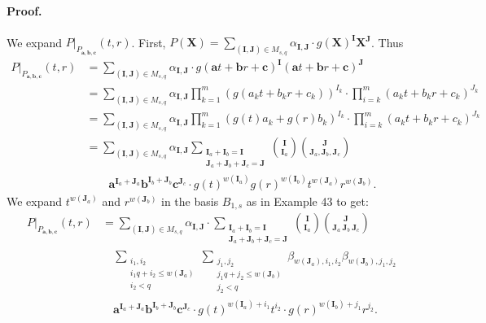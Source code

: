 \documentclass[10pt,a4paper]{article}
\begin{document}
\paragraph{Proof.} We expand $P|_{P_{\boldsymbol a,\boldsymbol b,\boldsymbol c}}(t,r)$. First, $P(\boldsymbol X)=\sum_{(\boldsymbol I,\boldsymbol J)\in M_{s,q}}\alpha_{\boldsymbol I,\boldsymbol J}\cdot g(\boldsymbol X)^{\boldsymbol I}\boldsymbol X^{\boldsymbol J}$. Thus
\begin{align*}
P|_{P_{\boldsymbol a,\boldsymbol b,\boldsymbol c}}(t,r)
&=\sum_{(\boldsymbol I,\boldsymbol J)\in M_{s,q}}\alpha_{\boldsymbol I,\boldsymbol J}\cdot g(\boldsymbol at+\boldsymbol br+\boldsymbol c)^{\boldsymbol I}(\boldsymbol at+\boldsymbol br+\boldsymbol c)^{\boldsymbol J}\\
&=\sum_{(\boldsymbol I,\boldsymbol J)\in M_{s,q}}\alpha_{\boldsymbol I,\boldsymbol J}\prod_{k=1}^m(g(a_kt+b_kr+c_k))^{I_k}\cdot\prod_{i=k}^m(a_kt+b_kr+c_k)^{J_k}\\
&=\sum_{(\boldsymbol I,\boldsymbol J)\in M_{s,q}}\alpha_{\boldsymbol I,\boldsymbol J}\prod_{k=1}^m(g(t)a_k+g(r)b_k)^{I_k}\cdot\prod_{i=k}^m(a_kt+b_kr+c_k)^{J_k}\\
&=\sum_{(\boldsymbol I,\boldsymbol J)\in M_{s,q}}\alpha_{\boldsymbol I,\boldsymbol J}\sum_{\substack{\boldsymbol I_a+\boldsymbol I_b=\boldsymbol I\\\boldsymbol J_a+\boldsymbol J_b+\boldsymbol J_c=\boldsymbol J}}\binom{\boldsymbol I}{\boldsymbol I_a}\binom{\boldsymbol J}{\boldsymbol J_a,\boldsymbol J_b,\boldsymbol J_c}\\
&\qquad\boldsymbol a^{\boldsymbol I_a+\boldsymbol J_a}\boldsymbol b^{\boldsymbol I_b+\boldsymbol J_b}\boldsymbol c^{\boldsymbol J_c}\cdot g(t)^{w(\boldsymbol I_a)}g(r)^{w(\boldsymbol I_b)}t^{w(\boldsymbol J_a)}r^{w(\boldsymbol J_b)}.\tag{14}
\end{align*}
We expand $t^{w(\boldsymbol J_a)}$ and $r^{w(\boldsymbol J_b)}$ in the basis $B_{1,s}$ as in Example 43 to get:
\begin{align*}
P|_{P_{\boldsymbol a,\boldsymbol b,\boldsymbol c}}(t,r)
&=\sum_{(\boldsymbol I,\boldsymbol J)\in M_{s,q}}\alpha_{\boldsymbol I,\boldsymbol J}\cdot\sum_{\substack{\boldsymbol I_a+\boldsymbol I_b=\boldsymbol I\\\boldsymbol J_a+\boldsymbol J_b+\boldsymbol J_c=\boldsymbol J}}\binom{\boldsymbol I}{\boldsymbol I_a}\binom{\boldsymbol J}{\boldsymbol J_a\ \boldsymbol J_b\ \boldsymbol J_c}\\
&\quad\sum_{\substack{i_1,i_2\\i_1q+i_2\leq w(\boldsymbol J_a)\\i_2<q}}\sum_{\substack{j_1,j_2\\j_1q+j_2\leq w(\boldsymbol J_b)\\j_2<q}}\beta_{w(\boldsymbol J_a),i_1,i_2}\beta_{w(\boldsymbol J_b),j_1,j_2}\\
&\quad\boldsymbol a^{\boldsymbol I_a+\boldsymbol J_a}\boldsymbol b^{\boldsymbol I_b+\boldsymbol J_b}\boldsymbol c^{\boldsymbol J_c}\cdot g(t)^{w(\boldsymbol I_a)+i_1}t^{i_2}\cdot g(r)^{w(\boldsymbol I_b)+j_1}r^{j_2}.\tag{15}
\end{align*}
\end{document}
